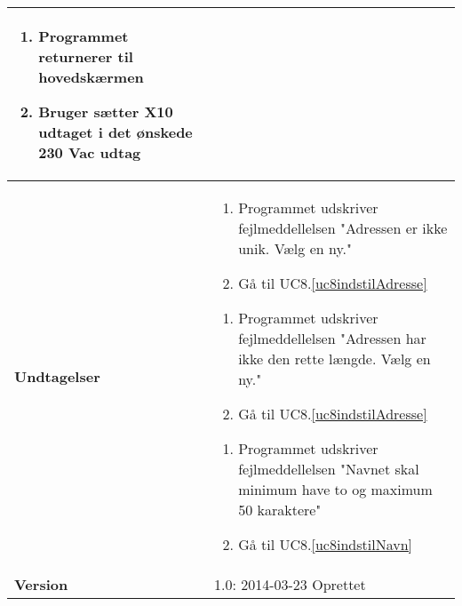 \begin{table}[H]
\begin{tabular}{|p{6cm}|p{8cm}|}
\begin{enumerate}
				\item Programmet returnerer til hovedskærmen
				
				\item Bruger sætter X10 udtaget i det ønskede 230 Vac udtag
																																	
			\end{enumerate}\\\hline
		
		\textbf{Undtagelser}					
		&\begin{enumerate}[label= \ref{uc8adresse}a.\arabic*.]
			\item Programmet udskriver fejlmeddellelsen "Adressen er ikke unik. Vælg en ny."
			
			\item Gå til UC8.\ref{uc8indstilAdresse}	\newline
		\end{enumerate}
		
	
		
		\begin{enumerate}[label= \ref{uc8adresse}b.\arabic*.]
			\item Programmet udskriver fejlmeddellelsen "Adressen har ikke den rette længde. Vælg en ny."
			
			\item Gå til UC8.\ref{uc8indstilAdresse}\newline
		\end{enumerate}
		
		
		
		\begin{enumerate}[label= \ref{uc8navn}a.\arabic*.]
			\item Programmet udskriver fejlmeddellelsen "Navnet skal minimum have to og maximum 50 karaktere"
			
			\item Gå til UC8.\ref{uc8indstilNavn}
		\end{enumerate}
											
		\\\hline
											
		\textbf{Version}		&1.0: 2014-03-23 Oprettet \\\hline

	\end{tabular}
	\label{UC8} 
\end{table}
